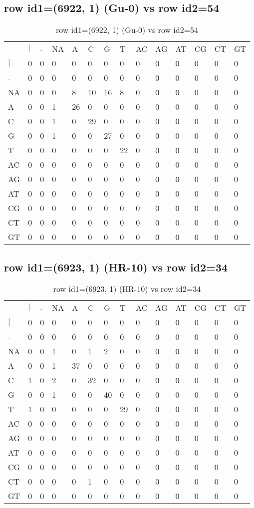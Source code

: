 \subsection{row id1=(6922, 1) (Gu-0) vs row id2=54}
\begin{center}
\begin{longtable}{|l|l|l|l|l|l|l|l|l|l|l|l|l|l|}
\caption{row id1=(6922, 1) (Gu-0) vs row id2=54} \label{table_dm106}\\
\hline
\\
\hline
&$|$&-&NA&A&C&G&T&AC&AG&AT&CG&CT&GT\\
$|$&0&0&0&0&0&0&0&0&0&0&0&0&0\\
-&0&0&0&0&0&0&0&0&0&0&0&0&0\\
NA&0&0&0&8&10&16&8&0&0&0&0&0&0\\
A&0&0&1&26&0&0&0&0&0&0&0&0&0\\
C&0&0&1&0&29&0&0&0&0&0&0&0&0\\
G&0&0&1&0&0&27&0&0&0&0&0&0&0\\
T&0&0&0&0&0&0&22&0&0&0&0&0&0\\
AC&0&0&0&0&0&0&0&0&0&0&0&0&0\\
AG&0&0&0&0&0&0&0&0&0&0&0&0&0\\
AT&0&0&0&0&0&0&0&0&0&0&0&0&0\\
CG&0&0&0&0&0&0&0&0&0&0&0&0&0\\
CT&0&0&0&0&0&0&0&0&0&0&0&0&0\\
GT&0&0&0&0&0&0&0&0&0&0&0&0&0\\
\hline
\end{longtable}
\end{center}

\subsection{row id1=(6923, 1) (HR-10) vs row id2=34}
\begin{center}
\begin{longtable}{|l|l|l|l|l|l|l|l|l|l|l|l|l|l|}
\caption{row id1=(6923, 1) (HR-10) vs row id2=34} \label{table_dm108}\\
\hline
\\
\hline
&$|$&-&NA&A&C&G&T&AC&AG&AT&CG&CT&GT\\
$|$&0&0&0&0&0&0&0&0&0&0&0&0&0\\
-&0&0&0&0&0&0&0&0&0&0&0&0&0\\
NA&0&0&1&0&1&2&0&0&0&0&0&0&0\\
A&0&0&1&37&0&0&0&0&0&0&0&0&0\\
C&1&0&2&0&32&0&0&0&0&0&0&0&0\\
G&0&0&1&0&0&40&0&0&0&0&0&0&0\\
T&1&0&0&0&0&0&29&0&0&0&0&0&0\\
AC&0&0&0&0&0&0&0&0&0&0&0&0&0\\
AG&0&0&0&0&0&0&0&0&0&0&0&0&0\\
AT&0&0&0&0&0&0&0&0&0&0&0&0&0\\
CG&0&0&0&0&0&0&0&0&0&0&0&0&0\\
CT&0&0&0&0&1&0&0&0&0&0&0&0&0\\
GT&0&0&0&0&0&0&0&0&0&0&0&0&0\\
\hline
\end{longtable}
\end{center}

